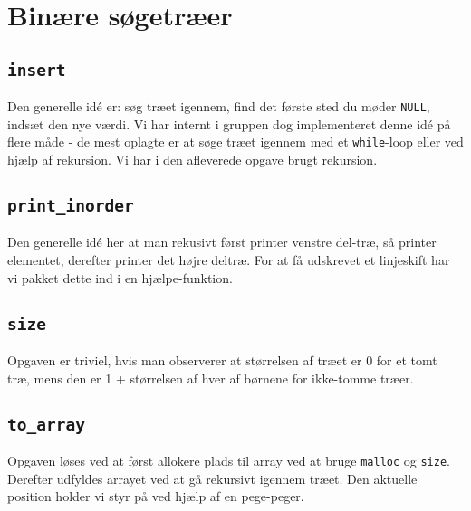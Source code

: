 \section{Binære søgetræer}

\subsection{\tt insert}

Den generelle idé er: søg træet igennem, find det første sted du møder
{\tt NULL}, indsæt den nye værdi. Vi har internt i gruppen dog implementeret
denne idé på flere måde - de mest oplagte er at søge træet igennem med et
{\tt while}-loop eller ved hjælp af rekursion. Vi har i den afleverede opgave
brugt rekursion.

\subsection{\tt print\_inorder}

Den generelle idé her at man rekusivt først printer venstre del-træ,
så printer elementet, derefter printer det højre deltræ. For at få udskrevet et
linjeskift har vi pakket dette ind i en hjælpe-funktion.

\subsection{\tt size}

Opgaven er triviel, hvis man observerer at størrelsen af træet er 0 for et
tomt træ, mens den er 1 + størrelsen af hver af børnene for ikke-tomme
træer.

\subsection{\tt to\_array}

Opgaven løses ved at først allokere plads til array ved at bruge {\tt malloc} og
{\tt size}. Derefter udfyldes arrayet ved at gå rekursivt igennem træet. Den
aktuelle position holder vi styr på ved hjælp af en pege-peger.
